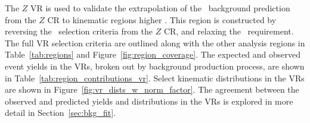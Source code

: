 The $Z$ VR is used to validate the extrapolation of the \ZGAMMAJETS\ background
prediction from the $Z$ CR to kinematic regions higher \HT.
This region is constructed by reversing the \HT\ selection criteria from the
$Z$ CR, and relaxing the \METSIG\ requirement.
The full VR selection criteria are outlined along with the other analysis
regions in Table~\ref{tab:regions} and Figure~\ref{fig:region_coverage}.
The expected and observed event yields in the VRs, broken out by background
production process, are shown in Table~\ref{tab:region_contributions_vr}.
Select kinematic distributions in the VRs are shown in
Figure~\ref{fig:vr_dists_w_norm_factor}.
The agreement between the observed and predicted yields and distributions in the
VRs is explored in more detail in Section~\ref{sec:bkg_fit}.

\begin{table}
  \caption{Number of expected events in each of the VRs broken down by process.
    The uncertainty in the total background prediction is the MC statistical
    uncertainty only for each background process.
    The total uncertainty is obtained by summing the uncertainty in each
    background process in quadrature.
    The $k_Z$ normalization factor is applied to the \ZGAMMAJETS\ background
    yield estimate.
    For each signal model, the ratio of expected signal events to the sum of the
    background in each region is show in parentheses.
    {\color{red} TODO add observed number events in each VR.}
    {\color{red} TODO update with only stat uncertainty.}
    {\color{red} TODO update with breakdown by flavor channel.}
  }
  \label{tab:region_contributions_vr}
\end{table}
